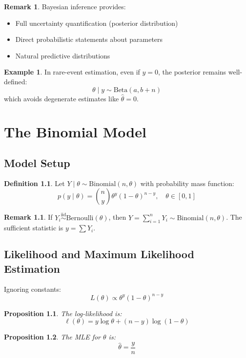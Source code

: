 \documentclass[12pt,oneside]{book}
\numberwithin{equation}{section}
\theoremstyle{definition}
\newtheorem{definition}{Definition}[section]
\newtheorem{example}{Example}[section]
\newtheorem{remark}{Remark}[section]
\theoremstyle{plain}
\newtheorem{proposition}{Proposition}[section]
\theoremstyle{remark}
\newcommand{\iid}{\overset{\text{iid}}{\sim}}
\newcommand{\Bern}{\mathrm{Bernoulli}}
\newcommand{\Bin}{\mathrm{Binomial}}
\newcommand{\BetaDist}{\mathrm{Beta}}
\begin{document}
\begin{remark}
Bayesian inference provides:
\begin{itemize}
    \item Full uncertainty quantification (posterior distribution)
    \item Direct probabilistic statements about parameters
    \item Natural predictive distributions
\end{itemize}
\end{remark}

\begin{example}
In rare-event estimation, even if $y=0$, the posterior remains well-defined:
$$
\theta \mid y \sim \BetaDist(a, b+n)
$$
which avoids degenerate estimates like $\hat{\theta}=0$.
\end{example}

\chapter{The Binomial Model}

\section{Model Setup}

\begin{definition}
Let $Y \mid \theta \sim \Bin(n,\theta)$ with probability mass function:
$$
p(y \mid \theta) = \binom{n}{y}\theta^y(1-\theta)^{n-y}, \quad \theta \in [0,1]
$$
\end{definition}

\begin{remark}
If $Y_i \iid \Bern(\theta)$, then $Y = \sum_{i=1}^n Y_i \sim \Bin(n,\theta)$. The sufficient statistic is $y = \sum Y_i$.
\end{remark}

\section{Likelihood and Maximum Likelihood Estimation}

Ignoring constants:
$$
L(\theta) \propto \theta^y(1-\theta)^{n-y}
$$

\begin{proposition}
The log-likelihood is:
$$
\ell(\theta) = y\log \theta + (n-y)\log(1-\theta)
$$
\end{proposition}

\begin{proposition}
The MLE for $\theta$ is:
$$
\hat{\theta} = \frac{y}{n}
$$
\end{proposition}
\end{document}

